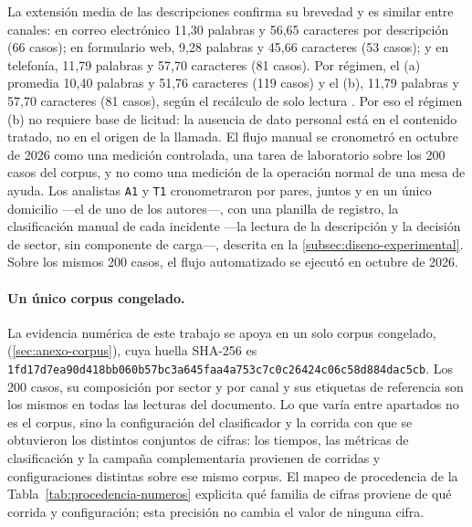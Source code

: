 La extensión media de las descripciones confirma su brevedad y es similar entre canales: en correo electrónico 11,30 palabras y 56,65 caracteres por descripción (66 casos); en formulario web, 9,28 palabras y 45,66 caracteres (53 casos); y en telefonía, 11,79 palabras y 57,70 caracteres (81 casos). Por régimen, el (a) promedia 10,40 palabras y 51,76 caracteres (119 casos) y el (b), 11,79 palabras y 57,70 caracteres (81 casos), según el recálculo de solo lectura . Por eso el régimen (b) no requiere base de licitud: la ausencia de dato personal está en el contenido tratado, no en el origen de la llamada. El flujo manual se cronometró en octubre de 2026 como una medición controlada, una tarea de laboratorio sobre los 200 casos del corpus, y no como una medición de la operación normal de una mesa de ayuda. Los analistas \texttt{A1} y \texttt{T1} cronometraron por pares, juntos y en un único domicilio ---el de uno de los autores---, con una planilla de registro, la clasificación manual de cada incidente ---la lectura de la descripción y la decisión de sector, sin componente de carga---, descrita en la \autoref{subsec:diseno-experimental}. Sobre los mismos 200 casos, el flujo automatizado se ejecutó en octubre de 2026.

\paragraph{Un único corpus congelado.} La evidencia numérica de este trabajo se apoya en un solo corpus congelado,  (\autoref{sec:anexo-corpus}), cuya huella SHA-256 es \texttt{1fd17d7e\allowbreak a90d418b\allowbreak b060b57b\allowbreak c3a645fa\allowbreak a4a753c7\allowbreak c0c26424\allowbreak c06c58d8\allowbreak 84dac5cb}. Los 200 casos, su composición por sector y por canal y sus etiquetas de referencia son los mismos en todas las lecturas del documento. Lo que varía entre apartados no es el corpus, sino la configuración del clasificador y la corrida con que se obtuvieron los distintos conjuntos de cifras: los tiempos, las métricas de clasificación y la campaña complementaria provienen de corridas y configuraciones distintas sobre ese mismo corpus. El mapeo de procedencia de la Tabla~\ref{tab:procedencia-numeros} explicita qué familia de cifras proviene de qué corrida y configuración; esta precisión no cambia el valor de ninguna cifra.

